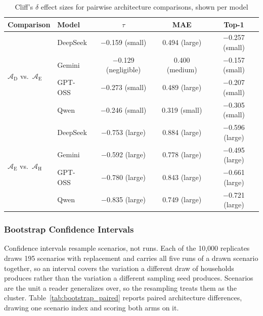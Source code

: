 \documentclass[11pt]{article}
\begin{document}
\begin{table}[htbp]
\centering
\small
\centering
\renewcommand{\arraystretch}{1.10}
\caption{Cliff's $\delta$ effect sizes for pairwise architecture comparisons, shown per model}
\label{tab:effect_sizes}
\begin{tabular}{@{}l l ccc@{}}
\toprule
Comparison & Model & $\tau$ & MAE & Top-1 \\
\midrule
\multirow{4}{*}{$\mathcal{A}_{\text{D}}$ vs.\ $\mathcal{A}_{\text{E}}$}
 & DeepSeek & $-$0.159 (small) & 0.494 (large) & $-$0.257 (small) \\
 & Gemini & $-$0.129 (negligible) & 0.400 (medium) & $-$0.157 (small) \\
 & GPT-OSS & $-$0.273 (small) & 0.489 (large) & $-$0.207 (small) \\
 & Qwen & $-$0.246 (small) & 0.319 (small) & $-$0.305 (small) \\
\midrule
\multirow{4}{*}{$\mathcal{A}_{\text{E}}$ vs.\ $\mathcal{A}_{\text{H}}$}
 & DeepSeek & $-$0.753 (large) & 0.884 (large) & $-$0.596 (large) \\
 & Gemini & $-$0.592 (large) & 0.778 (large) & $-$0.495 (large) \\
 & GPT-OSS & $-$0.780 (large) & 0.843 (large) & $-$0.661 (large) \\
 & Qwen & $-$0.835 (large) & 0.749 (large) & $-$0.721 (large) \\
\bottomrule
\end{tabular}
\renewcommand{\arraystretch}{1.0}
\end{table}

\subsubsection{Bootstrap Confidence Intervals}

Confidence intervals resample scenarios, not runs. Each of the 10,000 replicates draws 195 scenarios with replacement and carries all five runs of a drawn scenario together, so an interval covers the variation a different draw of households produces rather than the variation a different sampling seed produces. Scenarios are the unit a reader generalizes over, so the resampling treats them as the cluster. Table~\ref{tab:bootstrap_paired} reports paired architecture differences, drawing one scenario index and scoring both arms on it.
\end{document}
